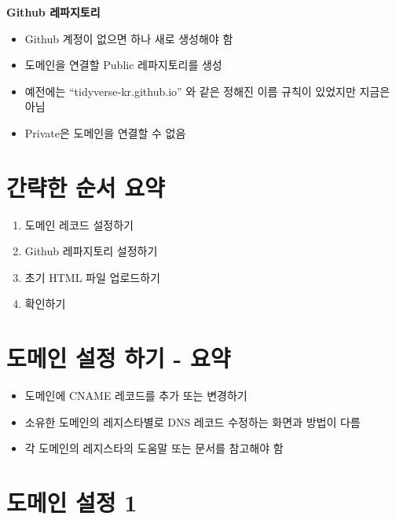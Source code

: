 \documentclass[
]{article}
\providecommand{\tightlist}{%
  \setlength{\itemsep}{0pt}\setlength{\parskip}{0pt}}
\begin{document}
\textbf{Github 레파지토리}

\begin{itemize}
\tightlist
\item
  Github 계정이 없으면 하나 새로 생성해야 함
\item
  도메인을 연결할 Public 레파지토리를 생성
\item
  예전에는 ``tidyverse-kr.github.io'' 와 같은 정해진 이름 규칙이
  있었지만 지금은 아님
\item
  Private은 도메인을 연결할 수 없음
\end{itemize}

\hypertarget{uxac04uxb7b5uxd55c-uxc21cuxc11c-uxc694uxc57d}{%
\section{간략한 순서
요약}\label{uxac04uxb7b5uxd55c-uxc21cuxc11c-uxc694uxc57d}}

\begin{enumerate}
\def\labelenumi{\arabic{enumi}.}
\tightlist
\item
  도메인 레코드 설정하기
\item
  Github 레파지토리 설정하기
\item
  초기 HTML 파일 업로드하기
\item
  확인하기
\end{enumerate}

\hypertarget{uxb3c4uxba54uxc778-uxc124uxc815-uxd558uxae30---uxc694uxc57d}{%
\section{도메인 설정 하기 -
요약}\label{uxb3c4uxba54uxc778-uxc124uxc815-uxd558uxae30---uxc694uxc57d}}

\begin{itemize}
\tightlist
\item
  도메인에 CNAME 레코드를 추가 또는 변경하기
\item
  소유한 도메인의 레지스타별로 DNS 레코드 수정하는 화면과 방법이 다름
\item
  각 도메인의 레지스타의 도움말 또는 문서를 참고해야 함
\end{itemize}

\hypertarget{uxb3c4uxba54uxc778-uxc124uxc815-1}{%
\section{도메인 설정 1}\label{uxb3c4uxba54uxc778-uxc124uxc815-1}}
\end{document}
